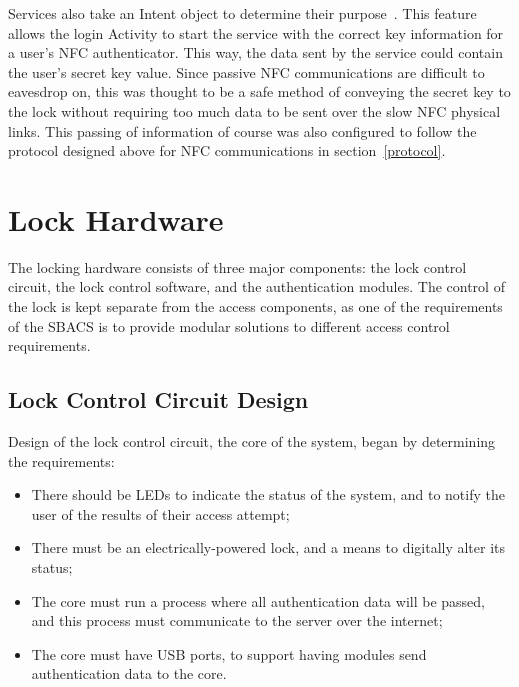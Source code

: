 \documentclass[12pt]{report}
\let\Oldsection\section
\renewcommand{\section}{\FloatBarrier\Oldsection}
\let\Oldsubsection\subsection
\renewcommand{\subsection}{\FloatBarrier\Oldsubsection}
\begin{document}
Services also take an Intent object to determine their purpose~\autocite{ANDROIDINTENT}. This feature allows the login Activity to start
the service with the correct key information for a user's NFC authenticator. This way, the data sent by the service could
contain the user's secret key value. Since passive NFC communications are difficult to eavesdrop on, this was thought to be
a safe method of conveying the secret key to the lock without requiring too much data to be sent over the slow NFC
physical links. This passing of information of course was also configured to follow the protocol designed above for NFC
communications in section~\ref{protocol}.


\section{Lock Hardware} \label{lock-hardware}


The locking hardware consists of three major components: the lock control circuit, the lock control software, and the 
authentication modules. The control of the lock is kept separate from the access components, as one of the requirements 
of the SBACS is to provide modular solutions to different access control requirements.


\subsection{Lock Control Circuit Design} \label{lock-control-circuit-design}

Design of the lock control circuit, the core of the system, began by determining the requirements:
\begin{itemize}
\item There should be LEDs to indicate the status of the system, and to notify the user of the results of their 
access attempt;
\item There must be an electrically-powered lock, and a means to digitally alter its status;
\item The core must run a process where all authentication data will be passed, and this process must communicate 
to the server over the internet;
\item The core must have USB ports, to support having modules send authentication data to the core.
\end{itemize}
\end{document}
